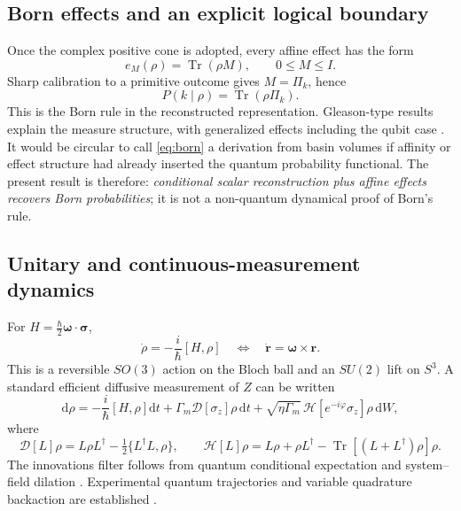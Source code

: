 \documentclass[10pt]{article}
\theoremstyle{definition}
\theoremstyle{remark}
\newcommand{\Tr}{\operatorname{Tr}}
\newcommand{\dd}{\mathrm d}
\newcommand{\cD}{\mathcal D}
\newcommand{\cH}{\mathcal H}
\begin{document}
\subsection{Born effects and an explicit logical boundary}

Once the complex positive cone is adopted, every affine effect has the form
\begin{equation}
  e_M(\rho)=\Tr(\rho M),
  \qquad 0\le M\le I.
  \label{eq:born-effect}
\end{equation}
Sharp calibration to a primitive outcome gives \(M=\Pi_k\), hence
\begin{equation}
  P(k\mid\rho)=\Tr(\rho\Pi_k).
  \label{eq:born}
\end{equation}
This is the Born rule in the reconstructed representation. Gleason-type results explain the measure structure, with generalized effects including the qubit case \citep{Gleason1957,Busch2003}. It would be circular to call \cref{eq:born} a derivation from basin volumes if affinity or effect structure had already inserted the quantum probability functional. The present result is therefore: \emph{conditional scalar reconstruction plus affine effects recovers Born probabilities}; it is not a non-quantum dynamical proof of Born's rule.

\subsection{Unitary and continuous-measurement dynamics}

For \(H=\frac{\hbar}{2}\bm\omega\cdot\bm\sigma\),
\begin{equation}
  \dot\rho=-\frac{i}{\hbar}[H,\rho]
  \quad\Longleftrightarrow\quad
  \dot{\bm r}=\bm\omega\times\bm r.
\end{equation}
This is a reversible \(SO(3)\) action on the Bloch ball and an \(SU(2)\) lift on \(S^3\). A standard efficient diffusive measurement of \(Z\) can be written
\begin{equation}
  \dd\rho
  =
  -\frac{i}{\hbar}[H,\rho]\dd t
  +\Gamma_m\cD[\sigma_z]\rho\,\dd t
  +\sqrt{\eta\Gamma_m}\,
  \cH[e^{-i\varphi}\sigma_z]\rho\,\dd W ,
  \label{eq:sme}
\end{equation}
where
\[
\cD[L]\rho=L\rho L^\dagger-\tfrac12\{L^\dagger L,\rho\},
\qquad
\cH[L]\rho=L\rho+\rho L^\dagger
-\Tr[(L+L^\dagger)\rho]\rho.
\]
The innovations filter follows from quantum conditional expectation and system--field dilation \citep{Bouten2007,WisemanMilburn2010}. Experimental quantum trajectories and variable quadrature backaction are established \citep{Murch2013,Hatridge2013,deLange2014,Atalaya2019}.
\end{document}
